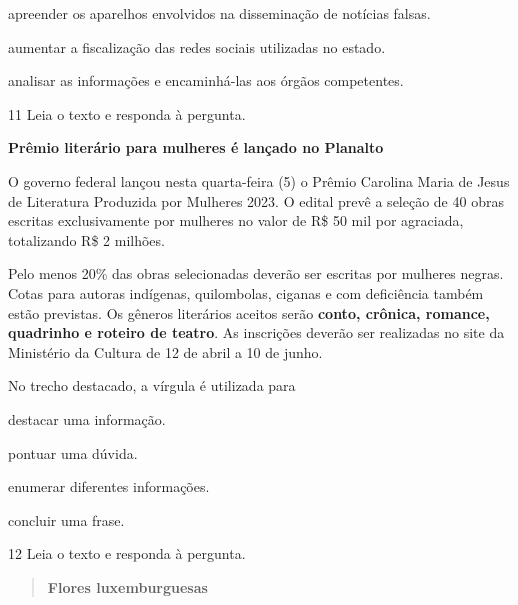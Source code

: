 \begin{myquote}
\begin{myescolha}
\begin{escolha}
  \item apreender os aparelhos envolvidos na disseminação de notícias
falsas.

  \item aumentar a fiscalização das redes sociais utilizadas no estado.

  \item analisar as informações e encaminhá-las aos órgãos competentes.
\end{escolha}

\num{11} Leia o texto e responda à pergunta.

\begin{myquote}
\textbf{Prêmio literário para mulheres é lançado no Planalto}

O governo federal lançou nesta quarta-feira (5) o Prêmio Carolina Maria
de Jesus de Literatura Produzida por Mulheres 2023. O edital prevê a
seleção de 40 obras escritas exclusivamente por mulheres no valor de R\$
50 mil por agraciada, totalizando R\$ 2 milhões.

Pelo menos 20\% das obras selecionadas deverão ser escritas por mulheres
negras. Cotas para autoras indígenas, quilombolas, ciganas e com
deficiência também estão previstas. Os gêneros literários aceitos serão
\textbf{conto, crônica, romance, quadrinho e roteiro de teatro}. As
inscrições deverão ser realizadas no site da Ministério da Cultura de 12
de abril a 10 de junho.

\end{myquote}

No trecho destacado, a vírgula é utilizada para

\begin{escolha}
  \item destacar uma informação.

  \item pontuar uma dúvida.

  \item enumerar diferentes informações.

  \item concluir uma frase.
\end{escolha}

\num{12} Leia o texto e responda à pergunta.

\begin{myquote}
\begin{verse}
\textbf{Flores luxemburguesas}


\end{verse}
\end{myquote}
\end{myescolha}
\end{myquote}
